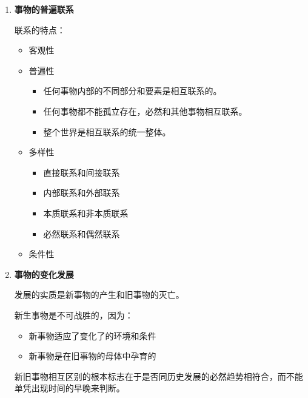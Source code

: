 \documentclass[12pt, a4paper, oneside]{ctexart}
\begin{document}
\begin{enumerate}
  \item {\bf 事物的普遍联系}
  
  联系的特点：
  \begin{itemize}
    \item 客观性
    \item 普遍性
    \begin{itemize}
      \item 任何事物内部的不同部分和要素是相互联系的。
      \item 任何事物都不能孤立存在，必然和其他事物相互联系。
      \item 整个世界是相互联系的统一整体。
    \end{itemize}
    \item 多样性
    \begin{itemize}
      \item 直接联系和间接联系
      \item 内部联系和外部联系
      \item 本质联系和非本质联系
      \item 必然联系和偶然联系
    \end{itemize}
    \item 条件性
  \end{itemize}

  \item {\bf 事物的变化发展}
  
  发展的实质是新事物的产生和旧事物的灭亡。

  新生事物是不可战胜的，因为：
  \begin{itemize}
    \item 新事物适应了变化了的环境和条件
    \item 新事物是在旧事物的母体中孕育的
  \end{itemize}

  新旧事物相互区别的根本标志在于是否同历史发展的必然趋势相符合，而不能单凭出现时间的早晚来判断。
\end{enumerate}
\end{document}
